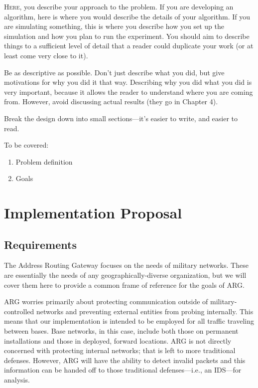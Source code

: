 \lettrine{H}{ere}, you describe your approach to the problem. If you are developing an
algorithm, here is where you would describe the details of your algorithm. If you are
simulating something, this is where you describe how you set up the simulation and
how you plan to run the experiment. You should aim to describe things to a sufficient
level of detail that a reader could duplicate your work (or at least come very close to
it).

\par Be as descriptive as possible. Don’t just describe what you did, but give motivations
for why you did it that way. Describing why you did what you did is very important,
because it allows the reader to understand where you are coming from. However,
avoid discussing actual results (they go in Chapter 4).

\par Break the design down into small sections—it’s easier to write, and easier to read.

\par To be covered:
\begin{enumerate}
\item Problem definition
\item Goals
\end{enumerate}

\section{Implementation Proposal}
\label{sec:implementation}
\subsection{Requirements}
\par The Address Routing Gateway focuses on the needs of military networks. These are essentially the needs of any geographically-diverse organization, but we will cover them here to provide a common frame of reference for the goals of ARG. 

\par ARG worries primarily about protecting communication outside of military-controlled networks and preventing external entities from probing internally. This means that our implementation is intended to be employed for all traffic traveling between bases. Base networks, in this case, include both those on permanent installations and those in deployed, forward locations. ARG is not directly concerned with protecting internal networks; that is left to more traditional defenses. However, ARG will have the ability to detect invalid packets and this information can be handed off to those traditional defenses---i.e., an IDS---for analysis.

